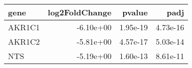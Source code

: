 \begin{tabular}{lrrr}
\toprule
  gene &  log2FoldChange &   pvalue &     padj \\
\midrule
AKR1C1 &       -6.10e+00 & 1.95e-19 & 4.73e-16 \\
AKR1C2 &       -5.81e+00 & 4.57e-17 & 5.03e-14 \\
   NTS &       -5.19e+00 & 1.60e-13 & 8.61e-11 \\
\bottomrule
\end{tabular}
